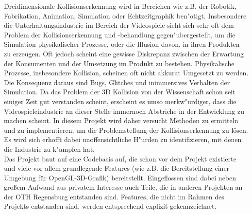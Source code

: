 
Dreidimensionale Kollisionserkennung wird in Bereichen wie z.B. der Robotik, Fabrikation, Animation, Simulation oder Echtzeitgraphik ben"otigt.
Insbesondere die Unterhaltungsindustrie im Bereich der Videospiele sieht sich sehr oft dem Problem der Kollisionserkennung und -behandlung gegen"ubergestellt, um die Simulation physikalischer Prozesse, oder die Illusion davon, in ihren Produkten zu erzeugen.
Oft jedoch scheint eine gewisse Diskrepanz zwischen der Erwartung der Konsumenten und der Umsetzung im Produkt zu bestehen. Physikalische Prozesse, insbesondere Kollision, scheinen oft nicht akkurat Umgesetzt zu werden. Die Konsequenz daraus sind Bugs, Glitches und inimmersives Verhalten der Simulation.
Da das Problem der 3D Kollision von der Wissenschaft schon seit einiger Zeit gut verstanden scheint, erscheint es umso merkw"urdiger, dass die Videospieleindustrie an dieser Stelle immernoch Abstriche in der Entwicklung zu machen scheint.
In diesem Projekt wird daher versucht Methoden zu ermitteln und zu implementieren, um die Problemstellung der Kollisionserkennung zu lösen.
Es wird sich erhofft dabei unoffensichtliche H"urden zu identifizieren, mit denen die Industrie zu k"ampfen hat. \\
Das Projekt baut auf eine Codebasis auf, die schon vor dem Projekt existierte und viele vor allem grundlegende Features (wie z.B. die Bereitstellung einer Umgebung für OpenGL-3D-Grafik) bereitstellt. Eingeflossen sind dabei neben großem Aufwand aus privatem Interesse auch Teile, die in anderen Projekten an der OTH Regensburg entstanden sind. Features, die nicht im Rahmen des Projekts entstanden sind, werden entsprechend explizit gekennzeichnet.